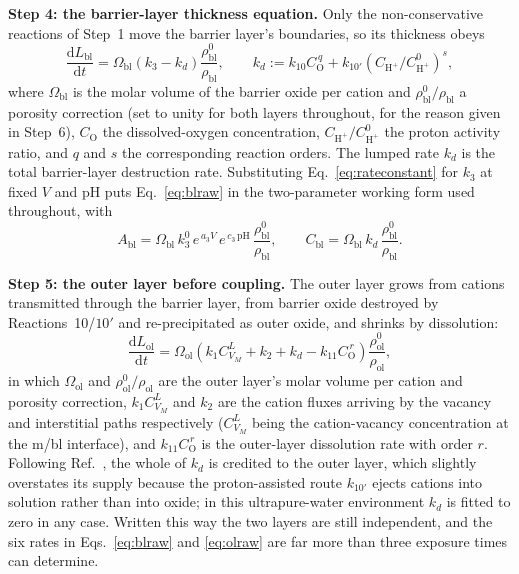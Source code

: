 \documentclass[a4paper,fleqn]{cas-sc}
\begin{document}
\textbf{Step 4: the barrier-layer thickness equation.} Only the
non-conservative reactions of Step~1 move the barrier layer's
boundaries, so its thickness obeys
\begin{equation}
\frac{\mathrm{d}L_\text{bl}}{\mathrm{d}t}
= \Omega_\text{bl}\left(k_3 - k_d\right)
\frac{\rho^0_\text{bl}}{\rho_\text{bl}},
\qquad
k_d := k_{10} C_\mathrm{O}^{\,q}
+ k_{10'}\left(C_{\mathrm{H}^+}/C^0_{\mathrm{H}^+}\right)^{s},
\label{eq:blraw}
\end{equation}
where $\Omega_\text{bl}$ is the molar volume of the barrier oxide per
cation and $\rho^0_\text{bl}/\rho_\text{bl}$ a porosity correction
(set to unity for both layers throughout, for the reason given in
Step~6),
$C_\mathrm{O}$ the dissolved-oxygen concentration,
$C_{\mathrm{H}^+}/C^0_{\mathrm{H}^+}$ the proton activity ratio, and
$q$ and $s$ the corresponding reaction orders. The lumped rate $k_d$ is
the total barrier-layer destruction rate. Substituting
Eq.~\eqref{eq:rateconstant} for $k_3$ at fixed $V$ and pH puts
Eq.~\eqref{eq:blraw} in the two-parameter working form used throughout,
with
\begin{equation}
A_\text{bl} = \Omega_\text{bl}\, k_3^{0}\, e^{\,a_3 V}\,
e^{\,c_3\,\mathrm{pH}}\, \frac{\rho^0_\text{bl}}{\rho_\text{bl}},
\qquad
C_\text{bl} = \Omega_\text{bl}\, k_d\,
\frac{\rho^0_\text{bl}}{\rho_\text{bl}} .
\label{eq:AblCbl}
\end{equation}

\textbf{Step 5: the outer layer before coupling.} The outer layer grows
from cations transmitted through the barrier layer, from barrier oxide
destroyed by Reactions~10/$10'$ and re-precipitated as outer oxide, and
shrinks by dissolution:
\begin{equation}
\frac{\mathrm{d}L_\text{ol}}{\mathrm{d}t}
= \Omega_\text{ol}\left(k_1 C_{V_M}^{L} + k_2 + k_d
- k_{11} C_\mathrm{O}^{\,r}\right)
\frac{\rho^0_\text{ol}}{\rho_\text{ol}},
\label{eq:olraw}
\end{equation}
in which $\Omega_\text{ol}$ and $\rho^0_\text{ol}/\rho_\text{ol}$ are
the outer layer's molar volume per cation and porosity correction,
$k_1 C_{V_M}^{L}$ and $k_2$ are the cation fluxes arriving by the
vacancy and interstitial paths respectively ($C_{V_M}^{L}$ being the
cation-vacancy concentration at the m/bl interface), and
$k_{11} C_\mathrm{O}^{\,r}$ is the outer-layer dissolution rate with
order $r$. Following Ref.~\citep{li2020scwpdm}, the whole of $k_d$ is
credited to the outer layer, which slightly overstates its supply
because the proton-assisted route $k_{10'}$ ejects cations into solution
rather than into oxide; in this ultrapure-water environment $k_d$ is
fitted to zero in any case. Written this way the two layers are still independent, and
the six rates in Eqs.~\eqref{eq:blraw} and \eqref{eq:olraw} are far more
than three exposure times can determine.
\end{document}
